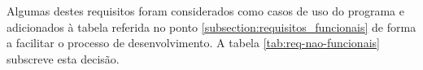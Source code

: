 Algumas destes requisitos foram considerados como casos de uso do programa e adicionados à tabela referida no ponto \ref{subsection:requisitos_funcionais} de forma a facilitar o processo de desenvolvimento. A tabela \ref{tab:req-nao-funcionais} subscreve esta decisão.










\